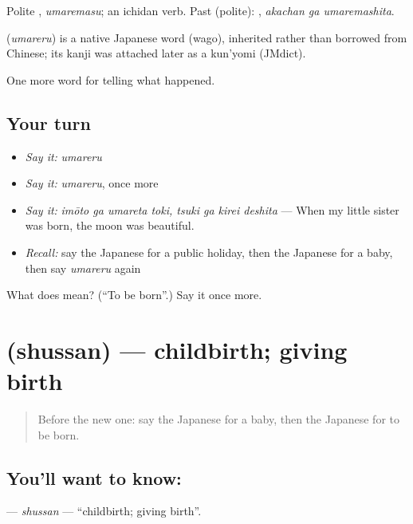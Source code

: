 Polite \textbf{}, \emph{umaremasu}; an ichidan verb. Past (polite): \textbf{ }, \emph{akachan ga umaremashita}.

\begin{cousinweb}
\textbf{} (\emph{umareru}) is a native Japanese word (wago), inherited rather than borrowed from Chinese; its kanji was attached later as a kun'yomi (JMdict).
\end{cousinweb}

\begin{grammarlens}[title={What you've built}]
One more word for telling what happened.
\end{grammarlens}

\subsection*{Your turn}
\begin{itemize}
\raggedright
  \item \emph{Say it:} \emph{umareru}
  \item \emph{Say it:} \emph{umareru}, once more
  \item \emph{Say it:} \emph{imōto ga umareta toki, tsuki ga kirei deshita} — When my little sister was born, the moon was beautiful.
  \item \emph{Recall:} say the Japanese for a public holiday, then the Japanese for a baby, then say \emph{umareru} again
\end{itemize}

\begin{tcolorbox}[breakable,colback=teal!4,colframe=teal!35!black,title={Before you move on}]
What does  mean? (\textquotedblleft{}To be born\textquotedblright{}.) Say it once more.
\end{tcolorbox}
\section[\texorpdfstring{\ja{しゅっさん} (shussan)}{しゅっさん (shussan)}]{ (shussan) — childbirth; giving birth}

\label{lesson:JA-C286-shussan}



\begin{quote}
Before the new one: say the Japanese for a baby, then the Japanese for to be born.
\end{quote}

\subsection*{You'll want to know: }
\textbf{} — \emph{shussan} — \textquotedblleft{}childbirth; giving birth\textquotedblright{}.

